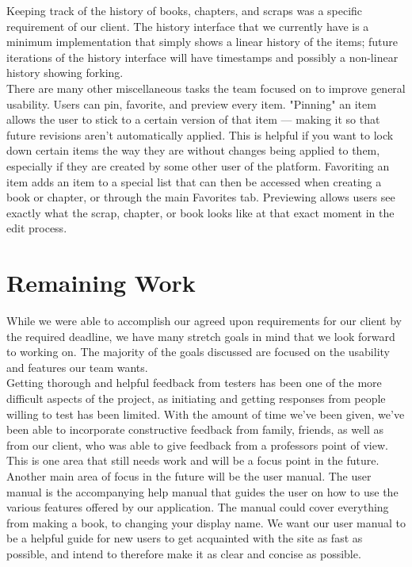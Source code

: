 \documentclass[onecolumn, draftclsnofoot,10pt, compsoc]{IEEEtran}
\begin{document}
\noindent Keeping track of the history of books, chapters, and scraps was a specific
requirement of our client. The history interface that we currently have is a minimum implementation
that simply shows a linear history of the items; future iterations of the history interface
will have timestamps and possibly a non-linear history showing forking. \\

\noindent There are many other miscellaneous tasks the team focused on to improve general usability.
Users can pin, favorite, and preview every item. "Pinning" an item allows the user to stick to a certain
version of that item --- making it so that future revisions aren't automatically applied. This
is helpful if you want to lock down certain items the way they are without changes being applied to them,
especially if they are created by some other user of the platform. Favoriting an item adds an item to
a special list that can then be accessed when creating a book or chapter, or through the main Favorites tab.
Previewing allows users see exactly what the scrap, chapter, or book looks like at that exact moment
in the edit process. \\

\noindent

\section{Remaining Work}

While we were able to accomplish our agreed upon requirements for our client by the
required deadline, we have many stretch goals in mind that we look forward to working on.
The majority of the goals discussed are focused on the usability and features our team wants. \\

\noindent Getting thorough and helpful feedback from testers has been one of the more difficult aspects of the project, as
initiating and getting responses from people willing to test has been limited. With the amount of time
we've been given, we've been able to incorporate constructive feedback from family, friends, as well
as from our client, who was able to give feedback from a professors point of view.
This is one area that still needs work and will be a focus point in the future. \\

\noindent Another main area of focus in the future will be the user manual. The user manual is the accompanying help manual
that guides the user on how to use the various features offered by our application. The manual could cover
everything from making a book, to changing your display name. We want our user manual to be a helpful guide for new users to get
acquainted with the site as fast as possible, and intend to therefore make it as clear and concise as possible. \\
\end{document}
